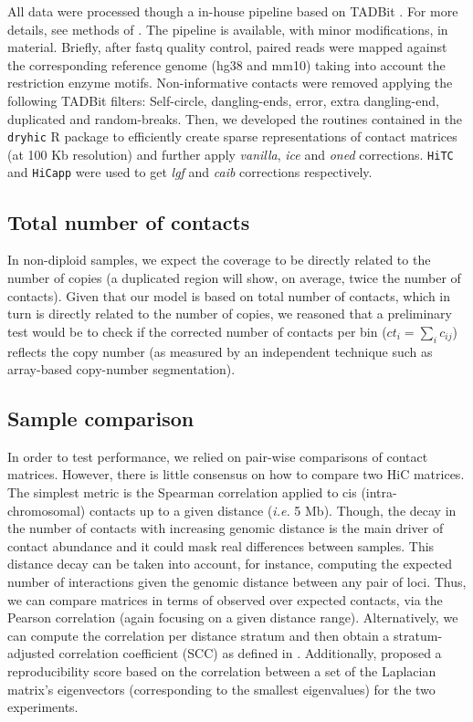 \documentclass{bioinfo}
\begin{document}
\begin{methods}
All data were processed though a in-house pipeline based on TADBit \citep{serra2016structural}. For more details, see methods of \cite{stadhouders2017transcription}. The pipeline is available, with minor modifications, in \cite{quilez2017managing} material. Briefly, after fastq quality control, paired reads were mapped against the corresponding reference genome (hg38 and mm10) taking into account the restriction enzyme motifs. Non-informative contacts were removed applying the following TADBit \citep{serra2016structural} filters: Self-circle, dangling-ends, error, extra dangling-end, duplicated and random-breaks. Then, we developed the routines contained in the \texttt{dryhic} R package to efficiently create sparse representations of contact matrices (at 100 Kb resolution) and further apply \textit{vanilla}, \textit{ice} and \textit{oned} corrections. \texttt{HiTC} \citep{servant2012hitc} and \texttt{HiCapp} \citep{wu2016computational} were used to get \textit{lgf} and \textit{caib} corrections respectively.


\subsection{Total number of contacts}

In non-diploid samples, we expect the coverage to be directly related to the number of copies (a duplicated region will show, on average, twice the number of contacts). Given that our model is based on total number of contacts, which in turn is directly related to the number of copies, we reasoned that a preliminary test would be to check if the corrected number of contacts per bin ($ct_i = \sum_{i}{c_{ij}}$) reflects the copy number (as measured by an independent technique such as array-based copy-number segmentation).


\subsection{Sample comparison}

In order to test performance, we relied on pair-wise comparisons of contact matrices. However, there is little consensus on how to compare two HiC matrices. The simplest metric is the Spearman correlation applied to cis (intra-chromosomal) contacts up to a given distance (\textit{i.e.} 5 Mb). Though, the decay in the number of contacts with increasing genomic distance is the main driver of contact abundance and it could mask real differences between samples. This distance decay can be taken into account, for instance, computing the expected number of interactions given the genomic distance between any pair of loci. Thus, we can compare matrices in terms of observed over expected contacts, via the Pearson correlation (again focusing on a given distance range). Alternatively, we can compute the correlation per distance stratum and then obtain a stratum-adjusted correlation coefficient (SCC) as defined in \cite{yang2017hicrep}. Additionally, \cite{yan2017hicspector} proposed a reproducibility score based on the correlation between a set of the Laplacian matrix's eigenvectors (corresponding to the smallest eigenvalues) for the two experiments.


\end{methods}
\end{document}
